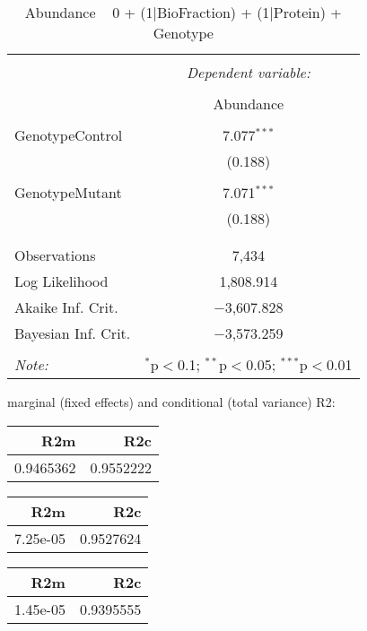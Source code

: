 \documentclass[11pt]{report}
\begin{document}
\begin{table}[!htbp] \centering 
  \caption{Abundance ~ 0 + (1|BioFraction) + (1|Protein) + Genotype} 
  \label{} 
\begin{tabular}{@{\extracolsep{5pt}}lc} 
\\[-1.8ex]\hline 
\hline \\[-1.8ex] 
 & \multicolumn{1}{c}{\textit{Dependent variable:}} \\ 
\cline{2-2} 
\\[-1.8ex] & Abundance \\ 
\hline \\[-1.8ex] 
 GenotypeControl & 7.077$^{***}$ \\ 
  & (0.188) \\ 
  & \\ 
 GenotypeMutant & 7.071$^{***}$ \\ 
  & (0.188) \\ 
  & \\ 
\hline \\[-1.8ex] 
Observations & 7,434 \\ 
Log Likelihood & 1,808.914 \\ 
Akaike Inf. Crit. & $-$3,607.828 \\ 
Bayesian Inf. Crit. & $-$3,573.259 \\ 
\hline 
\hline \\[-1.8ex] 
\textit{Note:}  & \multicolumn{1}{r}{$^{*}$p$<$0.1; $^{**}$p$<$0.05; $^{***}$p$<$0.01} \\ 
\end{tabular} 
\end{table} 
marginal (fixed effects) and conditional (total variance) R2:

\begin{tabular}{r|r}
\hline
R2m & R2c\\
\hline
0.9465362 & 0.9552222\\
\hline
\end{tabular}

\begin{tabular}{r|r}
\hline
R2m & R2c\\
\hline
7.25e-05 & 0.9527624\\
\hline
\end{tabular}

\begin{tabular}{r|r}
\hline
R2m & R2c\\
\hline
1.45e-05 & 0.9395555\\
\hline
\end{tabular}
\end{document}
